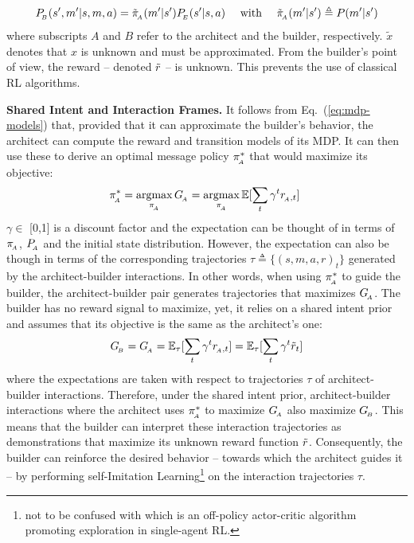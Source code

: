 \begin{equation}
\label{eq:mdp-models2}
P_{\!_B}(s',m'|s,m,a)= \tilde{\pi}_{\!_A}(m'|s') P_{\!_E}(s'|s,a) \quad \text{ with } \quad \tilde{\pi}_{\!_A}(m'|s') \triangleq P(m'|s')
\end{equation}
where subscripts $A$ and $B$ refer to the architect and the builder, respectively. $\tilde{x}$ denotes that $x$ is unknown and must be approximated. From the builder's point of view, the reward -- denoted $\tilde{r}$ -- is unknown. This prevents the use of classical RL algorithms.

\noindent\textbf{Shared Intent and Interaction Frames. } 
It follows from Eq.~(\ref{eq:mdp-models}) that, provided that it can approximate the builder's behavior, the architect can compute the reward and transition models of its MDP. It can then use these to derive an optimal message policy $\pi_{\!_A}^*$ that would maximize its objective:
\begin{equation}
\pi_{\!_A}^* = \operatorname*{argmax}_{\pi_{\!_A}}G_{\!_A} = \operatorname*{argmax}_{\pi_{\!_A}}\mathbb{E}[\sum_t \gamma^t r_{\!_A ,t}]\
\label{eq:pistar}
\end{equation}
$\gamma \in$ [0,1] is a discount factor and the expectation can be thought of in terms of $\pi_{\!_A}$, $P_{\!_A}$ and the initial state distribution. However, the expectation can also be though in terms of the corresponding trajectories $\tau \triangleq \{(s,m,a,r)_t\}$ generated by the architect-builder interactions. In other words, when using $\pi_{\!_A}^*$ to guide the builder, the architect-builder pair generates trajectories that maximizes $G_{\!_A}$.  The builder has no reward signal to maximize, yet, it relies on a shared intent prior and assumes that its objective is the same as the architect's one:
\begin{equation}
   G_{\!_B} = G_{\!_A} = \mathbb{E}_\tau[\sum_t \gamma^t r_{\!_A ,t}] = \mathbb{E}_\tau[\sum_t \gamma^t \tilde{r}_{t}] 
\end{equation}
where the expectations are taken with respect to trajectories $\tau$ of architect-builder interactions. Therefore, under the shared intent prior, architect-builder interactions where the architect uses $\pi_{\!_A}^*$ to maximize $G_{\!_A}$ also maximize $G_{\!_B}$. This means that the builder can interpret these interaction trajectories as demonstrations that maximize its unknown reward function $\tilde{r}$. Consequently, the builder can reinforce the desired behavior -- towards which the architect guides it -- by performing self-Imitation Learning\footnote{not to be confused with \citep{Oh2018SIL} which is an off-policy actor-critic algorithm promoting exploration in single-agent RL. } on the interaction trajectories $\tau$. 

